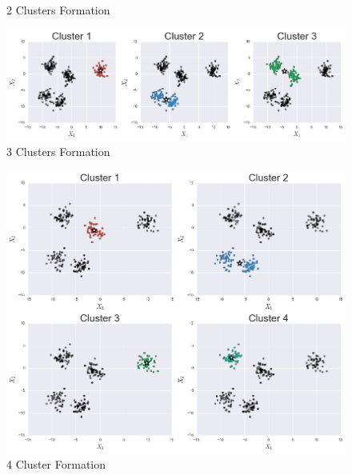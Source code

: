 \documentclass[10pt,twocolumn,letterpaper]{article}
\begin{document}
\begin{appendices}
\begin{figure}[htbp]
\caption{\label{fig:2-Clusters-Formation}2 Clusters Formation}


\end{figure}


\begin{figure}[htbp] 
\begin{center}
\includegraphics[scale=0.45]{figure/3_formation.png}
\end{center}

\caption{\label{fig:3-Clusters-Formation}3 Clusters Formation}
\end{figure}


\begin{figure}[htbp] 
\begin{center}
\includegraphics[scale=0.45]{figure/4_formation.png}
\end{center}

\caption{\label{fig:4-Cluster-Formation}4 Cluster Formation}


\end{figure}



\end{appendices}
\end{document}
